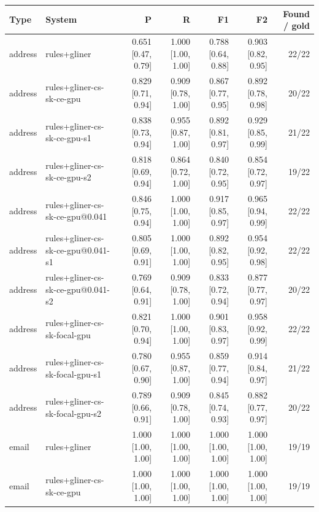 \providecommand{\ci}[2]{{\scriptsize [#1, #2]}}

\begin{table}[htbp]
\centering
\small
\begin{tabular}{llrrrrr}
\toprule
Type & System & P & R & F1 & F2 & Found / gold \\
\midrule
address & rules+gliner & 0.651 \ci{0.47}{0.79} & 1.000 \ci{1.00}{1.00} & 0.788 \ci{0.64}{0.88} & 0.903 \ci{0.82}{0.95} & 22/22 \\
address & rules+gliner-cs-sk-ce-gpu & 0.829 \ci{0.71}{0.94} & 0.909 \ci{0.78}{1.00} & 0.867 \ci{0.77}{0.95} & 0.892 \ci{0.78}{0.98} & 20/22 \\
address & rules+gliner-cs-sk-ce-gpu-s1 & 0.838 \ci{0.73}{0.94} & 0.955 \ci{0.87}{1.00} & 0.892 \ci{0.81}{0.97} & 0.929 \ci{0.85}{0.99} & 21/22 \\
address & rules+gliner-cs-sk-ce-gpu-s2 & 0.818 \ci{0.69}{0.94} & 0.864 \ci{0.72}{1.00} & 0.840 \ci{0.72}{0.95} & 0.854 \ci{0.72}{0.97} & 19/22 \\
address & rules+gliner-cs-sk-ce-gpu@0.041 & 0.846 \ci{0.75}{0.94} & 1.000 \ci{1.00}{1.00} & 0.917 \ci{0.85}{0.97} & 0.965 \ci{0.94}{0.99} & 22/22 \\
address & rules+gliner-cs-sk-ce-gpu@0.041-s1 & 0.805 \ci{0.69}{0.91} & 1.000 \ci{1.00}{1.00} & 0.892 \ci{0.82}{0.95} & 0.954 \ci{0.92}{0.98} & 22/22 \\
address & rules+gliner-cs-sk-ce-gpu@0.041-s2 & 0.769 \ci{0.64}{0.91} & 0.909 \ci{0.78}{1.00} & 0.833 \ci{0.72}{0.94} & 0.877 \ci{0.77}{0.97} & 20/22 \\
address & rules+gliner-cs-sk-focal-gpu & 0.821 \ci{0.70}{0.94} & 1.000 \ci{1.00}{1.00} & 0.901 \ci{0.83}{0.97} & 0.958 \ci{0.92}{0.99} & 22/22 \\
address & rules+gliner-cs-sk-focal-gpu-s1 & 0.780 \ci{0.67}{0.90} & 0.955 \ci{0.87}{1.00} & 0.859 \ci{0.77}{0.94} & 0.914 \ci{0.84}{0.97} & 21/22 \\
address & rules+gliner-cs-sk-focal-gpu-s2 & 0.789 \ci{0.66}{0.91} & 0.909 \ci{0.78}{1.00} & 0.845 \ci{0.74}{0.93} & 0.882 \ci{0.77}{0.97} & 20/22 \\
email & rules+gliner & 1.000 \ci{1.00}{1.00} & 1.000 \ci{1.00}{1.00} & 1.000 \ci{1.00}{1.00} & 1.000 \ci{1.00}{1.00} & 19/19 \\
email & rules+gliner-cs-sk-ce-gpu & 1.000 \ci{1.00}{1.00} & 1.000 \ci{1.00}{1.00} & 1.000 \ci{1.00}{1.00} & 1.000 \ci{1.00}{1.00} & 19/19 \\

\end{tabular}
\end{table}
